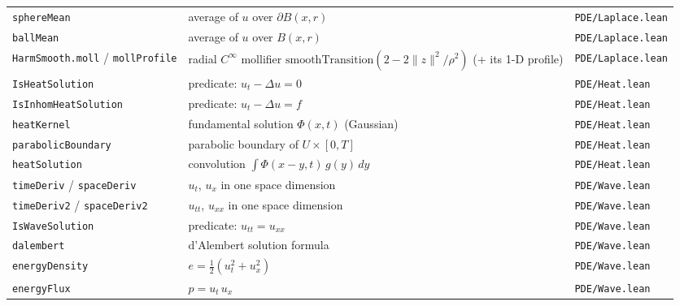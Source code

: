 ﻿\documentclass[12pt, a4paper]{article}
\renewcommand{\_}{\origunderscore\allowbreak}
\theoremstyle{definition}
\theoremstyle{plain}
\begin{document}
\begin{longtable}{@{}L{4.5cm}L{6.8cm}L{3.5cm}@{}}
  \texttt{sphereMean}               & average of $u$ over $\partial B(x,r)$               & \texttt{PDE/\allowbreak Laplace.\allowbreak lean} \\
  \texttt{ballMean}                 & average of $u$ over $B(x,r)$                        & \texttt{PDE/\allowbreak Laplace.\allowbreak lean} \\
  \texttt{HarmSmooth.moll} / \texttt{mollProfile} & radial $C^\infty$ mollifier $\mathrm{smoothTransition}(2-2\lVert z\rVert^2/\rho^2)$ (+ its 1-D profile) & \texttt{PDE/\allowbreak Laplace.\allowbreak lean} \\
  \texttt{IsHeatSolution}           & predicate: $u_t - \Delta u = 0$                     & \texttt{PDE/\allowbreak Heat.\allowbreak lean} \\
  \texttt{IsInhomHeatSolution}      & predicate: $u_t - \Delta u = f$                     & \texttt{PDE/\allowbreak Heat.\allowbreak lean} \\
  \texttt{heatKernel}               & fundamental solution $\Phi(x,t)$ (Gaussian)         & \texttt{PDE/\allowbreak Heat.\allowbreak lean} \\
  \texttt{parabolicBoundary}        & parabolic boundary of $U\times[0,T]$                & \texttt{PDE/\allowbreak Heat.\allowbreak lean} \\
  \texttt{heatSolution}             & convolution $\int \Phi(x-y,t)\,g(y)\,dy$            & \texttt{PDE/\allowbreak Heat.\allowbreak lean} \\
  \texttt{timeDeriv} / \texttt{spaceDeriv} & $u_t$, $u_x$ in one space dimension          & \texttt{PDE/\allowbreak Wave.\allowbreak lean} \\
  \texttt{timeDeriv2} / \texttt{spaceDeriv2} & $u_{tt}$, $u_{xx}$ in one space dimension  & \texttt{PDE/\allowbreak Wave.\allowbreak lean} \\
  \texttt{IsWaveSolution}           & predicate: $u_{tt} = u_{xx}$                        & \texttt{PDE/\allowbreak Wave.\allowbreak lean} \\
  \texttt{dalembert}                & d'Alembert solution formula                         & \texttt{PDE/\allowbreak Wave.\allowbreak lean} \\
  \texttt{energyDensity}            & $e = \tfrac12(u_t^2 + u_x^2)$                       & \texttt{PDE/\allowbreak Wave.\allowbreak lean} \\
  \texttt{energyFlux}               & $p = u_t\,u_x$                                      & \texttt{PDE/\allowbreak Wave.\allowbreak lean} \\

\end{longtable}
\end{document}
